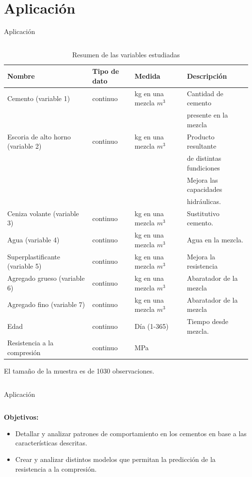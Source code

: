 \section{Aplicación}
\begin{frame}{Aplicación}
\begin{columns}
\begin{column}{0.9\textwidth}

\begin{table}[h]
\tiny
\centering
\begin{tabular}{|l|l|l|l|}
\hline
Nombre & Tipo de dato & Medida & Descripción \\
\hline
Cemento (variable 1) & continuo & kg en una mezcla $m^3$  &  Cantidad de cemento \\&&&presente en la mezcla \\
Escoria de alto horno (variable 2) & continuo & kg en una mezcla $m^3$ & Producto resultante \\&&&de distintas fundiciones\\&&& Mejora las capacidades \\&&& hidráulicas. \\
Ceniza volante (variable 3) & continuo & kg en una mezcla $m^3$ & Sustitutivo cemento.\\
Agua (variable 4) & continuo & kg en una mezcla $m^3$ & Agua en la mezcla.\\
Superplastificante (variable 5) & continuo & kg en una mezcla $m^3$ & Mejora la resistencia\\
Agregado grueso (variable 6) & continuo & kg en una mezcla $m^3$ &  Abaratador de la mezcla\\
Agregado fino (variable 7) & continuo & kg en una mezcla $m^3$ & Abaratador de la mezcla \\
Edad & continuo & Día (1-365) & Tiempo desde mezcla. \\
Resistencia a la compresión & continuo & MPa & \\
\hline
\end{tabular}
\caption{Resumen de las variables estudiadas}
\label{tab:Resumen Variables}
\end{table}
El tamaño de la muestra es de 1030 observaciones. 
\end{column}
\end{columns}
\end{frame}

\begin{frame}{Aplicación}
\begin{columns}
\begin{column}{0.9\textwidth}
\textbf{Objetivos:}

\begin{itemize}
\item Detallar y analizar patrones de comportamiento en los cementos en base a las características descritas. 
\item Crear y analizar distintos modelos que permitan la predicción de la resistencia a la compresión. 
\end{itemize}
\end{column}
\end{columns}
\end{frame}

